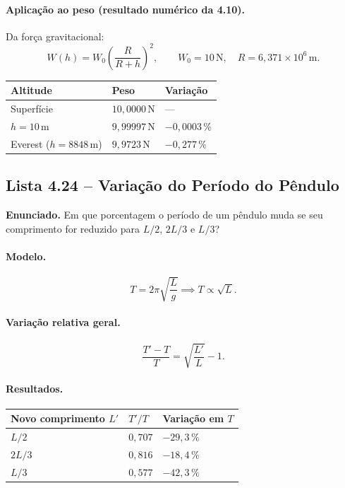 \documentclass[12pt,a4paper]{article}
\theoremstyle{definition}
\begin{document}
\paragraph{Aplica\c{c}\~ao ao peso (resultado num\'erico da 4.10).}
Da for\c{c}a gravitacional:
\begin{equation}
  W(h)=W_0\left(\frac{R}{R+h}\right)^2,
  \qquad W_0=10\,\text{N},
  \quad R=6{,}371\times10^6\,\text{m}.
\end{equation}
\begin{center}
\begin{tabular}{lll}
\toprule
Altitude & Peso & Varia\c{c}\~ao\\
\midrule
Superf\'icie  & $10{,}0000\,\text{N}$ & ---\\
$h=10\,\text{m}$ & $9{,}99997\,\text{N}$ & $-0{,}0003\,\%$\\
Everest ($h=8848\,\text{m}$) & $9{,}9723\,\text{N}$ & $-0{,}277\,\%$\\
\bottomrule
\end{tabular}
\end{center}

\subsection{Lista 4.24 -- Varia\c{c}\~ao do Per\'iodo do P\^endulo}

\textbf{Enunciado.} Em que porcentagem o per\'iodo de um p\^endulo muda se seu
comprimento for reduzido para $L/2$, $2L/3$ e $L/3$?

\paragraph{Modelo.}
\begin{equation}
  T = 2\pi\sqrt{\frac{L}{g}} \implies T \propto \sqrt{L}.
\end{equation}

\paragraph{Varia\c{c}\~ao relativa geral.}
\begin{equation}
  \frac{T'-T}{T} = \sqrt{\frac{L'}{L}}-1.
\end{equation}

\paragraph{Resultados.}
\begin{center}
\begin{tabular}{lll}
\toprule
Novo comprimento $L'$ & $T'/T$ & Varia\c{c}\~ao em $T$\\
\midrule
$L/2$    & $0{,}707$ & $-29{,}3\,\%$\\
$2L/3$   & $0{,}816$ & $-18{,}4\,\%$\\
$L/3$    & $0{,}577$ & $-42{,}3\,\%$\\
\bottomrule
\end{tabular}
\end{center}
\end{document}
